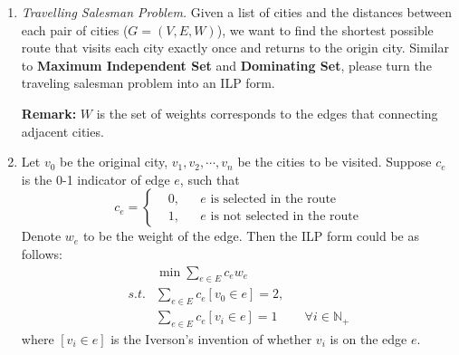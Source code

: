 \documentclass[12pt,a4paper]{article}
\makeatletter
\newtheorem*{solution}{Solution}
\theoremstyle{definition}
\renewenvironment{solution}[1][Solution] {\par\pushQED{\qed}\normalfont\topsep6\p@\@plus6\p@\relax\trivlist\item[\hskip\labelsep\bfseries#1\@addpunct{.}]\ignorespaces}{\popQED\endtrivlist\@endpefalse} \makeatother
\makeatother
\begin{document}
\begin{enumerate}
    \item 
    \textit{Travelling Salesman Problem.} Given a list of cities and the distances between each pair of cities ($ G=(V,E,W) $), we want to find the shortest possible route that visits each city exactly once and returns to the origin city. Similar to \textbf{Maximum Independent Set} and \textbf{Dominating Set}, please turn the traveling salesman problem into an ILP form.  
    
    \textbf{Remark:} $ W $ is the set of weights corresponds to the edges that connecting adjacent cities.  

    \begin{solution}
      Let $v_0$ be the original city, $v_1, v_2, \cdots, v_n$ be the cities to be visited. Suppose $c_e$ is the 0-1 indicator of edge $e$, such that
      \begin{equation*}
        c_e = \left\{\begin{aligned}
          &0,&&e \text{ is selected in the route}\\
          &1,&&e \text{ is not selected in the route}
        \end{aligned}\right.
      \end{equation*} 
      Denote $w_e$ to be the weight of the edge. Then the ILP form could be as follows:
      \begin{align*}
        &\min \sum_{e\in E} c_ew_e\\
        s.t.& \sum_{e\in E}c_e[v_0\in e]=2,\\
            & \sum_{e\in E}c_e[v_i\in e]=1 && \forall i \in \mathbb{N}_+
      \end{align*}
      where $[v_i\in e]$ is the Iverson's invention of whether $v_i$ is on the edge $e$.
    \end{solution}


\end{enumerate}
\end{document}
